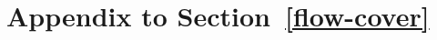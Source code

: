 \documentclass[11pt]{article}
\newcommand{\qed}{\hfill \mbox{\raggedright \rule{2mm}{3mm}}}
\newenvironment{proof}{\noindent{\bf Proof.}}{\qed}
\begin{document}
\section{Appendix to Section~\ref{flow-cover}}

\begin{comment} 
Proof of Theorem \ref{effective-cap:theorem}.

\begin{proof}
Consider an  instance with    cheap and   costly facilities
and   clients, and the bad  solution in which for  every       and      client        .  We add a
set of  facilities ,  all with  opening
costs, on the same point at  distance  from the rest (an instance of
the so-called \emph{facility location on a line}). In the bad solution
 we  additionally set  and   for all 
and for all clients .

We will prove that in every  cover  with respect to some client set
 and to the  client sets  for each , there must always be a
number of at least  clients whose assignment variables  to some costly and
to some   do not appear  in the constraint. This  is because if
either   for each   or  for
each    then  the  excess capacity    since
, which contradicts  the requirement that . So  there must  be a costly  facility  and  some facility
   such   that   for    the   corresponding   sets   we   have
, and so there is a set  of  clients  whose assignment to those  facilities does not  appear in the
constraint. We exchange the values of  and 
for all , leaving everything else the same, and we obtain a
solution  .   We  can  prove  similarly  to  the  proof  of  Lemma
\ref{assi-sym} that  is  a convex combination of integer solutions
and thus solution  satisfies the inequality since the  parts
of  and  visible to that inequality are the same.

We modify  the construction of  Lemma \ref{assi-sym} in  the following
way: facility   is  opened  of  the time but  is active
 of  the time,  when none  of  the costly
facilities  are  opened.  When it  is  not  active,  the capacity  of  its
corresponding bin is . When a costly other than  is opened
the  experiment is  the same  as  in Lemma  \ref{assi-sym}. If  costly
facility  is opened the  capacity of the corresponding bin is
  and the  capacity of
the  cheap  is  .  We randomly  select   some
 clients  that do not belong  to  to be  tossed in the
bin of  we randomly
distribute  the balls corresponding  to the  remaining clients  to the
slots of  the cheap facilities. When   is active,  and thus no
costly facility  is opened, the  capacity of the corresponding  bin is


\end{comment}
\end{document}
